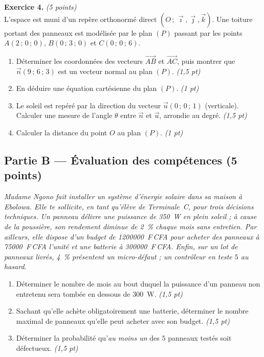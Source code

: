 \smallskip
\noindent\textbf{Exercice 4.} \hfill\textit{(5 points)}\\
L'espace est muni d'un repère orthonormé direct $(O\,;\,\vec\imath,\vec\jmath,\vec k)$. Une
toiture portant des panneaux est modélisée par le plan $(P)$ passant par les points
$A(2\,;\,0\,;\,0)$, $B(0\,;\,3\,;\,0)$ et $C(0\,;\,0\,;\,6)$.
\begin{enumerate}[label=\arabic*)]
\item Déterminer les coordonnées des vecteurs $\vec{AB}$ et $\vec{AC}$, puis montrer que
$\vec n(9\,;\,6\,;\,3)$ est un vecteur normal au plan $(P)$. \hfill\textit{(1,5 pt)}
\item En déduire une équation cartésienne du plan $(P)$. \hfill\textit{(1 pt)}
\item Le soleil est repéré par la direction du vecteur $\vec u(0\,;\,0\,;\,1)$ (verticale).
Calculer une mesure de l'angle $\theta$ entre $\vec n$ et $\vec u$, arrondie au degré. \hfill\textit{(1,5 pt)}
\item Calculer la distance du point $O$ au plan $(P)$. \hfill\textit{(1 pt)}
\end{enumerate}

\subsection*{Partie B — Évaluation des compétences \hfill (5 points)}

\noindent\textit{Madame Ngono fait installer un système d'énergie solaire dans sa maison à
Ebolowa. Elle te sollicite, en tant qu'élève de Terminale~C, pour trois décisions
techniques. Un panneau délivre une puissance de \SI{350}{\watt} en plein soleil ; à cause
de la poussière, son rendement diminue de \SI{2}{\percent} chaque mois sans entretien. Par
ailleurs, elle dispose d'un budget de \num{1200000}~F\,CFA pour acheter des panneaux à
\num{75000}~F\,CFA l'unité et une batterie à \num{300000}~F\,CFA. Enfin, sur un lot de
panneaux livrés, \SI{4}{\percent} présentent un micro-défaut ; un contrôleur en teste $5$ au hasard.}

\begin{enumerate}[label=\textbf{Tâche \arabic*.},leftmargin=2.4em]
\item Déterminer le nombre de mois au bout duquel la puissance d'un panneau non entretenu
sera tombée en dessous de \SI{300}{\watt}. \hfill\textit{(1,5 pt)}
\item Sachant qu'elle achète obligatoirement une batterie, déterminer le nombre maximal de
panneaux qu'elle peut acheter avec son budget. \hfill\textit{(1,5 pt)}
\item Déterminer la probabilité qu'\emph{au moins un} des $5$ panneaux testés soit défectueux. \hfill\textit{(1,5 pt)}
\end{enumerate}
\par{}

